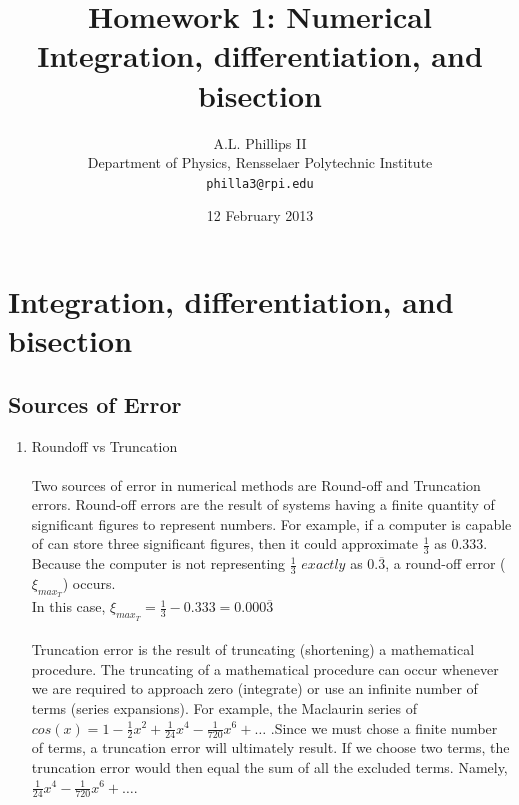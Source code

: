 \documentclass{report}
\begin{document}
\title{\textbf{Homework 1:} Numerical Integration, differentiation, and bisection}
\author{A.L. Phillips II\\
  Department of Physics,%
  Rensselaer Polytechnic Institute\\
  \texttt{philla3@rpi.edu}}
\date{12 February 2013}
\maketitle
\chapter{Integration, differentiation, and bisection}

\section{Sources of Error}
\begin{enumerate}
\item Roundoff vs Truncation
\\
\\Two sources of error in numerical methods are Round-off and Truncation errors. Round-off errors are the result of systems having a finite quantity of significant figures to represent numbers. For example, if a computer is capable of can store three significant figures, then it could approximate $ \frac{1}{3}$ as $0.333$. Because the computer is not representing $ \frac{1}{3}$ $exactly$ as $0.\overline{3}$, a round-off error ($\xi_{max_{T}}$) occurs. 
\\In this case, $\displaystyle \xi_{max_{T}} = \frac{1}{3} - 0.333 = 0.000\overline{3} $
\\
\\Truncation error is the result of truncating (shortening) a mathematical procedure. The truncating of a mathematical procedure can occur whenever we are required to approach zero (integrate) or use an infinite number of terms (series expansions). For example, the Maclaurin series of $cos(x) = 1 - \frac{1}{2}x^2 + \frac{1}{24}x^4 - \frac{1}{720}x^6 + \ldots$ .Since we must chose a finite number of terms, a truncation error will ultimately result. If we choose two terms, the truncation error would then equal the sum of all the excluded terms. Namely, $\frac{1}{24}x^4 - \frac{1}{720}x^6 + \ldots$.  

\end{enumerate}
\end{document}
